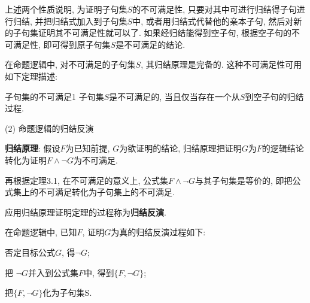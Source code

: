 上述两个性质说明, 为证明子句集$S$的不可满足性, 只要对其中可进行归结得子句进行归结, 并把归结式加入到子句集$S$中, 或者用归结式代替他的亲本子句, 然后对新的子句集证明其不可满足性就可以了.
如果经归结能得到空子句, 根据空子句的不可满足性, 即可得到原子句集$S$是不可满足的结论.

在命题逻辑中, 对不可满足的子句集$S$, 其归结原理是完备的.
这种不可满足性可用如下定理描述:
\begin{mythm}{子句集的不可满足}{1}\label{AIthm3.2}
  子句集$S$是不可满足的, 当且仅当存在一个从$S$到空子句的归结过程.
\end{mythm}

(2) 命题逻辑的归结反演

\textbf{归结原理}: 假设$F$为已知前提, $G$为欲证明的结论, 归结原理把证明$G$为$F$的逻辑结论转化为证明$F\wedge \neg G$为不可满足.

再根据定理3.1, 在不可满足的意义上, 公式集$F\wedge \neg G$与其子句集是等价的, 即把公式集上的不可满足转化为子句集上的不可满足.

应用归结原理证明定理的过程称为\textbf{归结反演}.

在命题逻辑中, 已知$F$, 证明$G$为真的归结反演过程如下:

    \quad{} 否定目标公式$G$, 得$\neg G$;

    \quad{} 把 $\neg G$并入到公式集$F$中, 得到$\{F, \neg G\}$;

    \quad{} 把$\{F, \neg G\}$化为子句集S.

